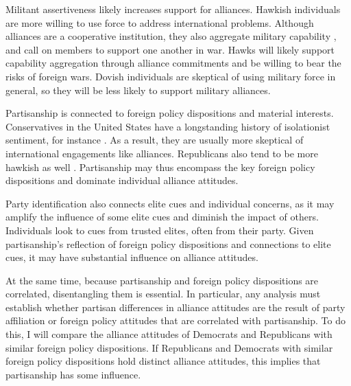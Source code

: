 \documentclass[12pt]{article}
\begin{document}
Militant assertiveness likely increases support for alliances. 
Hawkish individuals are more willing to use force to address international problems. 
Although alliances are a cooperative institution, they also aggregate military capability \citep{FordhamPoast2014}, and call on members to support one another in war.
Hawks will likely support capability aggregation through alliance commitments and be willing to bear the risks of foreign wars.  
Dovish individuals are skeptical of using military force in general, so they will be less likely to support military alliances. 




Partisanship is connected to foreign policy dispositions and material interests. 
Conservatives in the United States have a longstanding history of isolationist sentiment, for instance \citep{Kupchan2020}.
As a result, they are usually more skeptical of international engagements like alliances. 
Republicans also tend to be more hawkish as well \citep{Gries2014}. 
Partisanship may thus encompass the key foreign policy dispositions and dominate individual alliance attitudes. 


Party identification also connects elite cues and individual concerns, as it may amplify the influence of some elite cues and diminish the impact of others.
Individuals look to cues from trusted elites, often from their party. 
Given partisanship's reflection of foreign policy dispositions and connections to elite cues, it may have substantial influence on alliance attitudes. 


At the same time, because partisanship and foreign policy dispositions are correlated, disentangling them is essential. 
In particular, any analysis must establish whether partisan differences in alliance attitudes are the result of party affiliation or foreign policy attitudes that are correlated with partisanship. 
To do this, I will compare the alliance attitudes of Democrats and Republicans with similar foreign policy dispositions. 
If Republicans and Democrats with similar foreign policy dispositions hold distinct alliance attitudes, this implies that partisanship has some influence. 
\end{document}

